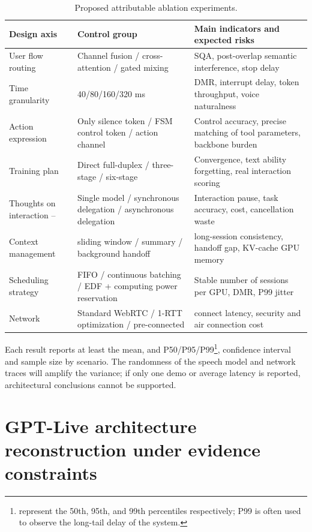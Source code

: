 \documentclass[UTF8,fontset=none,a4paper,10pt]{ctexart}
\begin{document}
\begin{table}[H]
\centering\small
\caption{Proposed attributable ablation experiments.}
\begin{tabularx}{\textwidth}{p{3.0cm}p{4.0cm}X}
\toprule
Design axis & Control group & Main indicators and expected risks \\
\midrule
User flow routing & Channel fusion / cross-attention / gated mixing & SQA, post-overlap semantic interference, stop delay \\
Time granularity & 40/80/160/320 ms & DMR, interrupt delay, token throughput, voice naturalness \\
Action expression & Only silence token / FSM control token / action channel & Control accuracy, precise matching of tool parameters, backbone burden \\
Training plan & Direct full-duplex / three-stage / six-stage & Convergence, text ability forgetting, real interaction scoring \\
Thoughts on interaction -- & Single model / synchronous delegation / asynchronous delegation & Interaction pause, task accuracy, cost, cancellation waste \\
Context management & sliding window / summary / background handoff & long-session consistency, handoff gap, KV-cache GPU memory \\
Scheduling strategy & FIFO / continuous batching / EDF + computing power reservation & Stable number of sessions per GPU, DMR, P99 jitter \\
Network & Standard WebRTC / 1-RTT optimization / pre-connected & connect latency, security and air connection cost \\
\bottomrule
\end{tabularx}
\end{table}

Each result reports at least the mean, and P50/P95/P99\footnote{ represent the 50th, 95th, and 99th percentiles respectively; P99 is often used to observe the long-tail delay of the system. }, confidence interval and sample size by scenario. The randomness of the speech model and network traces will amplify the variance; if only one demo or average latency is reported, architectural conclusions cannot be supported.

\section{GPT-Live architecture reconstruction under evidence constraints}
\end{document}
